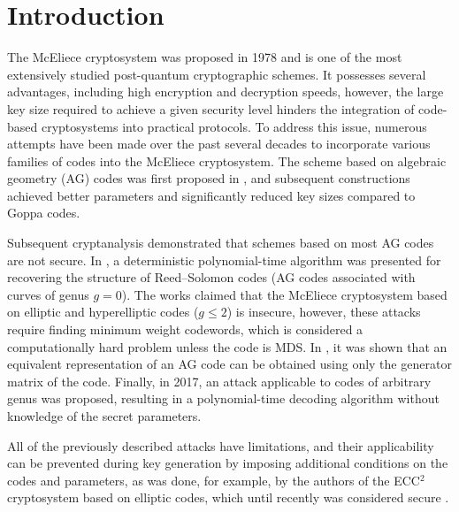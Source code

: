 \documentclass[sn-mathphys-num]{sn-jnl_modified}
\begin{document}
\maketitle



\section{Introduction}

The McEliece cryptosystem was proposed in 1978 \cite{McEliece78} and is one of the most extensively studied post-quantum cryptographic schemes. It possesses several advantages, including high encryption and decryption speeds, however, the large key size required to achieve a given security level hinders the integration of code-based cryptosystems into practical protocols. To address this issue, numerous attempts have been made over the past several decades to incorporate various families of codes into the McEliece cryptosystem. The scheme based on algebraic geometry (AG) codes was first proposed in \cite{JM96}, and subsequent constructions achieved better parameters and significantly reduced key sizes compared to Goppa codes.

Subsequent cryptanalysis demonstrated that schemes based on most AG codes are not secure. In \cite{SS92}, a deterministic polynomial-time algorithm was presented for recovering the structure of Reed--Solomon codes (AG codes associated with curves of genus $g = 0$). The works \cite{Min07,FM08} claimed that the McEliece cryptosystem based on elliptic and hyperelliptic codes ($g \leq 2$) is insecure, however, these attacks require finding minimum weight codewords, which is considered a computationally hard problem \cite{Che08} unless the code is MDS. In \cite{MMP14}, it was shown that an equivalent representation of an AG code can be obtained using only the generator matrix of the code. Finally, in 2017, an attack \cite{CMP17} applicable to codes of arbitrary genus was proposed, resulting in a polynomial-time decoding algorithm without knowledge of the secret parameters.

All of the previously described attacks have limitations, and their applicability can be prevented during key generation by imposing additional conditions on the codes and parameters, as was done, for example, by the authors of the ECC$^2$ cryptosystem \cite{ECC2} based on elliptic codes, which until recently was considered secure \cite{Sh25}. 
\end{document}
